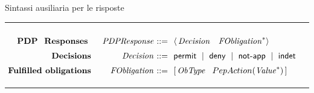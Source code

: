 \begin{table}
\footnotesize

\caption{Sintassi ausiliaria per le risposte}
\hrule
$
\begin{array}{@{\ }r@{\ \ \ \ }r@{\ }r@{\ \ }l@{\ }}

&&&\\[-.2cm]
{\textbf{PDP \ Responses }} &
\mathit{PDPResponse} & ::= & \langle \,\mathit{Decision} \ \ \ \mathit{FObligation}^* \rangle
\\[.2cm]
{\textbf{Decisions}} &
\mathit{Decision} & ::= & \permit \Sep \deny \Sep \notApp \Sep \indet
\\[.2cm]
{\textbf{Fulfilled obligations}} &
\mathit{FObligation} & ::= &  [ \, \mathit{ObType} \ \ \obl{\mathit{Value}} \, ]\\[.1cm]

\end{array}
$\\
\hrule
\label{tab:facpl_context_syntax}
\end{table}
